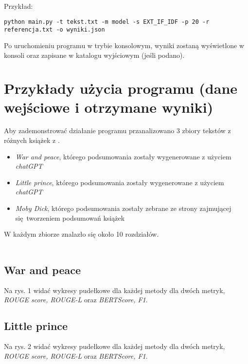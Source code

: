 \documentclass{article}
\begin{document}
Przykład:
\begin{lstlisting}
python main.py -t tekst.txt -m model -s EXT_IF_IDF -p 20 -r referencja.txt -o wyniki.json
\end{lstlisting}

Po uruchomieniu programu w trybie konsolowym, wyniki zostaną wyświetlone w konsoli oraz zapisane w katalogu wyjściowym (jeśli podano).

\section{Przykłady użycia programu (dane wejściowe i otrzymane wyniki)}
Aby zademonstrować działanie programu przanalizowano 3 zbiory tekstów z różnych książek z \cite{gutenberg}.
\begin{itemize}
	\item \textit{War and peace}, którego podsumowania zostały wygenerowane z użyciem \textit{chatGPT}
	\item \textit{Little prince}, którego podsumowania zostały wygenerowane z użyciem \textit{chatGPT}
	\item \textit{Moby Dick}, którego podsumowania zostały zebrane ze strony zajmującej się tworzeniem podsumowań
		książek \cite{sparknotes}
\end{itemize}
W każdym zbiorze znalazło się około 10 rozdziałów.\\\\

\subsection{War and peace}
Na rys. 1 widać wykresy pudełkowe dla każdej metody dla dwóch metryk, \textit{ROUGE score, ROUGE-L} oraz 
\textit{BERTScore, F1}.

\subsection{Little prince}
Na rys. 2 widać wykresy pudełkowe dla każdej metody dla dwóch metryk, \textit{ROUGE score, ROUGE-L} oraz 
\textit{BERTScore, F1}.
\end{document}
